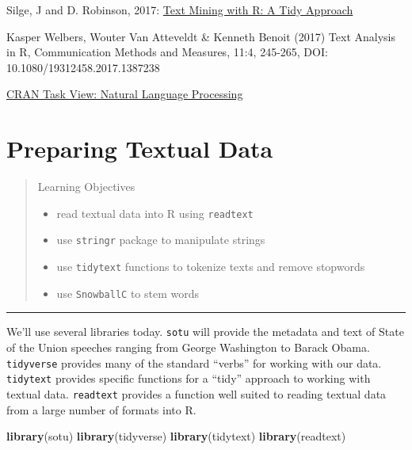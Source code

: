 \documentclass[]{book}
\newenvironment{Shaded}{\begin{snugshade}}{\end{snugshade}}
\newcommand{\KeywordTok}[1]{\textcolor[rgb]{0.13,0.29,0.53}{\textbf{#1}}}
\newcommand{\NormalTok}[1]{#1}
\providecommand{\tightlist}{%
  \setlength{\itemsep}{0pt}\setlength{\parskip}{0pt}}
\begin{document}
Silge, J and D. Robinson, 2017: \href{http://tidytextmining.com/}{Text Mining with R: A Tidy Approach}

Kasper Welbers, Wouter Van Atteveldt \& Kenneth Benoit (2017) Text Analysis in R, Communication Methods and Measures, 11:4, 245-265, DOI: 10.1080/19312458.2017.1387238

\href{https://CRAN.R-project.org/view=NaturalLanguageProcessing}{CRAN Task View: Natural Language Processing}

\hypertarget{textprep}{%
\chapter{Preparing Textual Data}\label{textprep}}

\begin{quote}
Learning Objectives

\begin{itemize}
\tightlist
\item
  read textual data into R using \texttt{readtext}
\item
  use \texttt{stringr} package to manipulate strings
\item
  use \texttt{tidytext} functions to tokenize texts and remove stopwords
\item
  use \texttt{SnowballC} to stem words
\end{itemize}
\end{quote}

\begin{center}\rule{0.5\linewidth}{\linethickness}\end{center}

We'll use several libraries today. \texttt{sotu} will provide the metadata and text of State of the Union speeches ranging from George Washington to Barack Obama. \texttt{tidyverse} provides many of the standard ``verbs'' for working with our data. \texttt{tidytext} provides specific functions for a ``tidy'' approach to working with textual data. \texttt{readtext} provides a function well suited to reading textual data from a large number of formats into R.

\begin{Shaded}
\begin{Highlighting}[]
\KeywordTok{library}\NormalTok{(sotu)}
\KeywordTok{library}\NormalTok{(tidyverse)}
\KeywordTok{library}\NormalTok{(tidytext)}
\KeywordTok{library}\NormalTok{(readtext)}
\end{Highlighting}
\end{Shaded}
\end{document}
